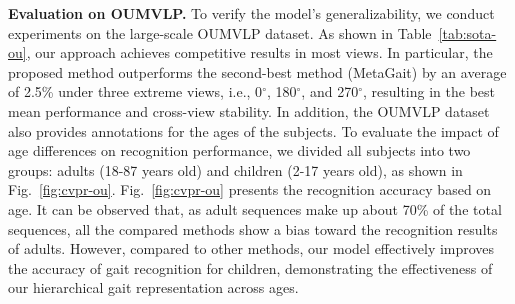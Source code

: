 \documentclass[10pt,twocolumn,letterpaper]{article}
\begin{document}
\noindent\textbf{Evaluation on OUMVLP.} To verify the model's generalizability, we conduct experiments on the large-scale OUMVLP dataset.  As shown in Table~\ref{tab:sota-ou}, our approach achieves competitive results in most views. In particular, the proposed method outperforms the second-best method (MetaGait) by an average of 2.5\% under three extreme views, i.e., 0$^{\circ}$, 180$^{\circ}$, and 270$^{\circ}$, resulting in the best mean performance and cross-view stability. In addition, the OUMVLP dataset also provides annotations for the ages of the subjects. To evaluate the impact of age differences on recognition performance, we divided all subjects into two groups: adults (18-87 years old) and children (2-17 years old), as shown in Fig.~\ref{fig:cvpr-ou}.  Fig.~\ref{fig:cvpr-ou} presents the recognition accuracy based on age. It can be observed that, as adult sequences make up about 70\% of the total sequences, all the compared methods show a bias toward the recognition results of adults. However, compared to other methods, our model effectively improves the accuracy of gait recognition for children, demonstrating the effectiveness of our hierarchical gait representation across ages.







\end{document}
